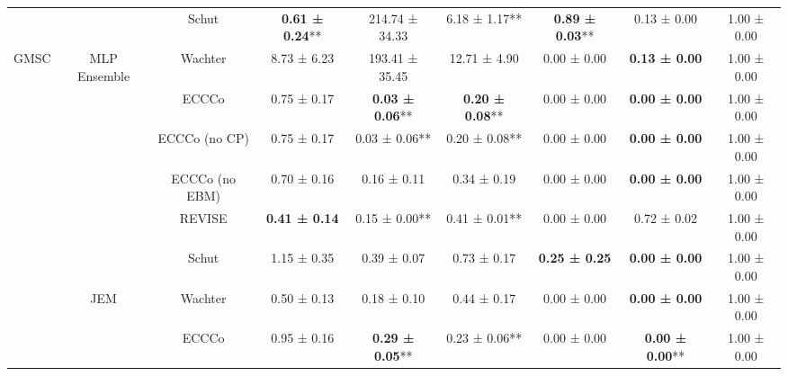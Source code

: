 \begin{table}
{\begin{tabular}[t]{ccccccccc}
 &  & Schut & \textbf{0.61 ± 0.24}** & 214.74 ± 34.33\hphantom{*}\hphantom{*} & 6.18 ± 1.17** & \textbf{0.89 ± 0.03}** & 0.13 ± 0.00\hphantom{*}\hphantom{*} & 1.00 ± 0.00\hphantom{*}\hphantom{*}\\

\multirow[t]{-16}{*}{\centering\arraybackslash GMSC} & \multirow[t]{-4}{*}{\centering\arraybackslash MLP Ensemble} & Wachter & 8.73 ± 6.23\hphantom{*}\hphantom{*} & 193.41 ± 35.45\hphantom{*}\hphantom{*} & 12.71 ± 4.90\hphantom{*}\hphantom{*} & 0.00 ± 0.00\hphantom{*}\hphantom{*} & \textbf{0.13 ± 0.00}\hphantom{*}\hphantom{*} & 1.00 ± 0.00\hphantom{*}\hphantom{*}\\
\cmidrule{1-9}
 &  & ECCCo & 0.75 ± 0.17\hphantom{*}\hphantom{*} & \textbf{0.03 ± 0.06}** & \textbf{0.20 ± 0.08}** & 0.00 ± 0.00\hphantom{*}\hphantom{*} & \textbf{0.00 ± 0.00}\hphantom{*}\hphantom{*} & 1.00 ± 0.00\hphantom{*}\hphantom{*}\\

 &  & ECCCo (no CP) & 0.75 ± 0.17\hphantom{*}\hphantom{*} & 0.03 ± 0.06** & 0.20 ± 0.08** & 0.00 ± 0.00\hphantom{*}\hphantom{*} & \textbf{0.00 ± 0.00}\hphantom{*}\hphantom{*} & 1.00 ± 0.00\hphantom{*}\hphantom{*}\\

 &  & ECCCo (no EBM) & 0.70 ± 0.16\hphantom{*}\hphantom{*} & 0.16 ± 0.11\hphantom{*}\hphantom{*} & 0.34 ± 0.19\hphantom{*}\hphantom{*} & 0.00 ± 0.00\hphantom{*}\hphantom{*} & \textbf{0.00 ± 0.00}\hphantom{*}\hphantom{*} & 1.00 ± 0.00\hphantom{*}\hphantom{*}\\

 &  & REVISE & \textbf{0.41 ± 0.14}\hphantom{*}\hphantom{*} & 0.15 ± 0.00** & 0.41 ± 0.01** & 0.00 ± 0.00\hphantom{*}\hphantom{*} & 0.72 ± 0.02\hphantom{*}\hphantom{*} & 1.00 ± 0.00\hphantom{*}\hphantom{*}\\

 &  & Schut & 1.15 ± 0.35\hphantom{*}\hphantom{*} & 0.39 ± 0.07\hphantom{*}\hphantom{*} & 0.73 ± 0.17\hphantom{*}\hphantom{*} & \textbf{0.25 ± 0.25}\hphantom{*}\hphantom{*} & \textbf{0.00 ± 0.00}\hphantom{*}\hphantom{*} & 1.00 ± 0.00\hphantom{*}\hphantom{*}\\

 & \multirow[t]{-6}{*}{\centering\arraybackslash JEM} & Wachter & 0.50 ± 0.13\hphantom{*}\hphantom{*} & 0.18 ± 0.10\hphantom{*}\hphantom{*} & 0.44 ± 0.17\hphantom{*}\hphantom{*} & 0.00 ± 0.00\hphantom{*}\hphantom{*} & \textbf{0.00 ± 0.00}\hphantom{*}\hphantom{*} & 1.00 ± 0.00\hphantom{*}\hphantom{*}\\
\cmidrule{2-9}
 &  & ECCCo & 0.95 ± 0.16\hphantom{*}\hphantom{*} & \textbf{0.29 ± 0.05}** & 0.23 ± 0.06** & 0.00 ± 0.00\hphantom{*}\hphantom{*} & \textbf{0.00 ± 0.00}** & 1.00 ± 0.00\hphantom{*}\hphantom{*}\\


\end{tabular}}
\end{table}
